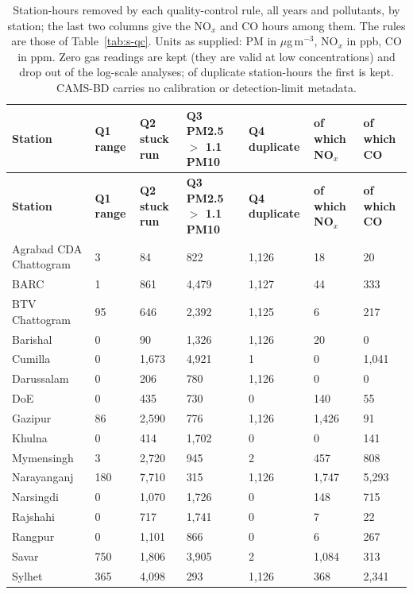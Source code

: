 \begingroup\footnotesize
\begin{longtable}{L{3.4cm} C{1.7cm} C{1.7cm} C{1.7cm} C{1.7cm} C{1.7cm} C{1.7cm}}
\caption{Station-hours removed by each quality-control rule, all years and pollutants, by station; the last two columns give the NO$_x$ and CO hours among them. The rules are those of Table~\ref{tab:s-qc}. Units as supplied: PM in $\mu$g\,m$^{-3}$, NO$_x$ in ppb, CO in ppm. Zero gas readings are kept (they are valid at low concentrations) and drop out of the log-scale analyses; of duplicate station-hours the first is kept. CAMS-BD carries no calibration or detection-limit metadata.}\label{tab:s-qc-station}\\
\toprule
\textbf{Station} & \textbf{Q1 range} & \textbf{Q2 stuck run} & \textbf{Q3 PM2.5 $>$ 1.1 PM10} & \textbf{Q4 duplicate} & \textbf{of which NO$_x$} & \textbf{of which CO} \\
\midrule\endfirsthead
\toprule
\textbf{Station} & \textbf{Q1 range} & \textbf{Q2 stuck run} & \textbf{Q3 PM2.5 $>$ 1.1 PM10} & \textbf{Q4 duplicate} & \textbf{of which NO$_x$} & \textbf{of which CO} \\
\midrule\endhead
\bottomrule\endfoot
Agrabad CDA Chattogram & 3 & 84 & 822 & 1,126 & 18 & 20 \\
BARC & 1 & 861 & 4,479 & 1,127 & 44 & 333 \\
BTV Chattogram & 95 & 646 & 2,392 & 1,125 & 6 & 217 \\
Barishal & 0 & 90 & 1,326 & 1,126 & 20 & 0 \\
Cumilla & 0 & 1,673 & 4,921 & 1 & 0 & 1,041 \\
Darussalam & 0 & 206 & 780 & 1,126 & 0 & 0 \\
DoE & 0 & 435 & 730 & 0 & 140 & 55 \\
Gazipur & 86 & 2,590 & 776 & 1,126 & 1,426 & 91 \\
Khulna & 0 & 414 & 1,702 & 0 & 0 & 141 \\
Mymensingh & 3 & 2,720 & 945 & 2 & 457 & 808 \\
Narayanganj & 180 & 7,710 & 315 & 1,126 & 1,747 & 5,293 \\
Narsingdi & 0 & 1,070 & 1,726 & 0 & 148 & 715 \\
Rajshahi & 0 & 717 & 1,741 & 0 & 7 & 22 \\
Rangpur & 0 & 1,101 & 866 & 0 & 6 & 267 \\
Savar & 750 & 1,806 & 3,905 & 2 & 1,084 & 313 \\
Sylhet & 365 & 4,098 & 293 & 1,126 & 368 & 2,341 \\
\end{longtable}
\endgroup
